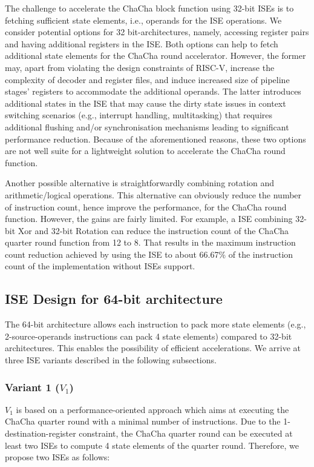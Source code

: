 The challenge to accelerate the ChaCha block function using 32-bit ISEs is to fetching sufficient state elements, i.e., operands for the ISE operations.
We consider potential options for 32 bit-architectures, namely, accessing register pairs and having additional registers in the ISE.
Both options can help to fetch additional state elements for the ChaCha round accelerator. 
However, the former may, apart from violating the design constraints of RISC-V, 
increase the complexity of decoder and register files, and 
induce increased size of pipeline stages' registers to accommodate the additional operands.
The latter introduces additional states in the ISE that may cause the dirty state issues in context switching scenarios (e.g., interrupt handling, multitasking) that requires additional flushing and/or synchronisation mechanisms leading to significant performance reduction.
Because of the aforementioned reasons, these two options are not well suite for a lightweight solution to accelerate the ChaCha round function.

Another possible alternative is straightforwardly combining rotation and arithmetic/logical operations. 
This alternative can obviously reduce the number of instruction count, hence improve the performance, for the ChaCha round function.
However, the gains are fairly limited. 
For example, a ISE combining 32-bit Xor and 32-bit Rotation can reduce the instruction count of the ChaCha quarter round function from 
12 to 8. 
That results in the maximum instruction count reduction achieved by using the ISE to about 66.67\% of the instruction count of the implementation without ISEs support.

\subsection{ISE Design for 64-bit architecture}
The 64-bit architecture allows each instruction to pack more state elements (e.g., 2-source-operands instructions can pack 4 state elements) compared to 32-bit architectures. 
This enables the possibility of efficient accelerations.
We arrive at three ISE variants described in the following subsections. 

\subsubsection{Variant 1 ($V_1$)}
$V_1$ is based on a performance-oriented approach which aims at executing the ChaCha quarter round with a minimal number of instructions.
Due to the 1-destination-register constraint, the ChaCha quarter round can be executed at least two ISEs to compute 4 state elements of the quarter round.
Therefore, we propose two ISEs as follows:


